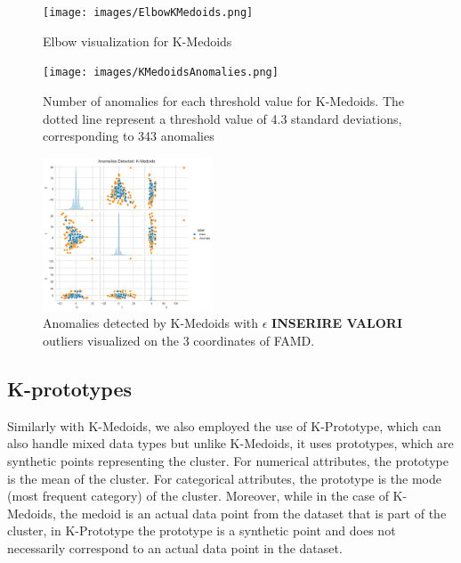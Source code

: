 \documentclass[a4paper]{article}
\begin{document}
\begin{figure}
    \centering
    \texttt{[image: images/ElbowKMedoids.png]}
    \caption{Elbow visualization for K-Medoids}
    \label{fig:elbowkmedoids}
\end{figure}


\begin{figure}
    \centering
    \texttt{[image: images/KMedoidsAnomalies.png]}
    \caption{Number of anomalies for each threshold value for K-Medoids. The dotted line represent a threshold value of 4.3 standard deviations, corresponding to 343 anomalies}
    \label{fig:kmedoidsAnomalies}
\end{figure}

\begin{figure}
    \centering
    \includegraphics[width=0.45\textwidth]{images/famd_kmedoids.png}
    \caption{Anomalies detected by K-Medoids with $\epsilon$ \textbf{INSERIRE VALORI} outliers visualized on the 3 coordinates of FAMD.}
    \label{fig:famd_kmedoids}
\end{figure}

\subsection{K-prototypes}
Similarly with K-Medoids, we also employed the use of K-Prototype, which can also handle mixed data types but unlike K-Medoids, it uses prototypes, which are synthetic points representing the cluster. For numerical attributes, the prototype is the mean of the cluster. For categorical attributes, the prototype is the mode (most frequent category) of the cluster. Moreover, while in the case of K-Medoids, the medoid is an actual data point from the dataset that is part of the cluster, in K-Prototype the prototype is a synthetic point and does not necessarily correspond to an actual data point in the dataset.
\end{document}
